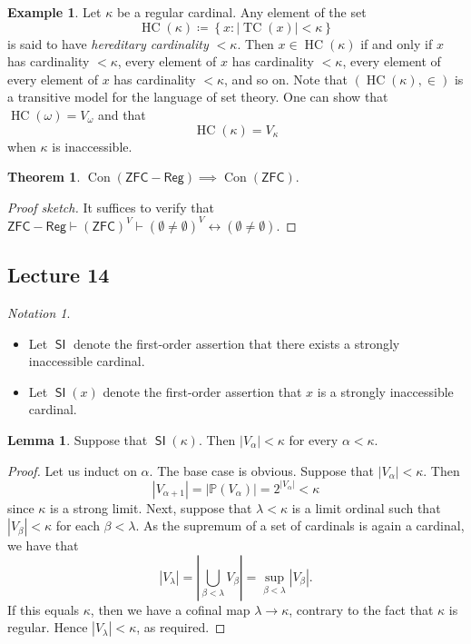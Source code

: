 \documentclass[10pt,letterpaper,cm]{nupset}
\theoremstyle{definition}
\newtheorem{exmp}[definition]{Example}
\theoremstyle{theorem}
\newtheorem{theorem}[definition]{Theorem}
\newtheorem{lemma}[definition]{Lemma}
\theoremstyle{remark}
\newtheorem*{notation}{Notation}
\renewcommand{\P}{\mathbb P}
\newcommand{\1}{\mathbf{1}}
\newcommand{\0}{\vec 0}
\newcommand{\zfc}{\mathsf{ZFC}}
\DeclareMathOperator{\si}{\mathsf{SI}}
\DeclareMathOperator{\con}{Con}
\DeclareMathOperator{\hc}{HC}
\DeclareMathOperator{\tc}{TC}
\newcommand{\bi}{\begin{itemize}}
\newcommand{\ei}{\end{itemize}}
\begin{document}
\begin{exmp}
Let $\kappa$ be a regular cardinal. Any element of the set $$\hc(\kappa) \coloneqq \left\{x : \left\lvert{\tc(x)}\right\rvert < \kappa\right\} $$ is said to have \textit{hereditary cardinality $<\kappa$}. Then $x \in \hc(\kappa)$ if and only if $x$ has cardinality $< \kappa$, every element of $x$ has cardinality $< \kappa$, every element of every element of $x$ has cardinality $< \kappa$, and so on. Note that $\left(\hc(\kappa), \in\right) $ is a transitive model for the language of set theory.  One can show that $\hc(\omega) = V_{\omega}$ and that 
\[ \label{eqn:si}
\hc(\kappa) =V_{\kappa} \tag{$\star$}
\]
when $\kappa$ is inaccessible. 
\end{exmp}

\begin{theorem}
$\con(\zfc - \mathsf{Reg}) \implies \con(\zfc)$.
\end{theorem}
\begin{proof}[Proof sketch]
It suffices to verify that $\zfc - \mathsf{Reg} \vdash \left(\zfc\right)^V \vdash \left(\emptyset \ne \emptyset \right)^V \leftrightarrow  \left(\emptyset \ne \emptyset\right)$.
\end{proof}

\subsection{Lecture 14}

\begin{notation}$ $
\bi
\item Let $\si$ denote the first-order assertion that there exists a strongly inaccessible cardinal.
\item Let $\si(x)$ denote the first-order assertion that $x$ is a strongly inaccessible cardinal.
\ei
\end{notation}

\begin{lemma}\label{Vcard}
Suppose that $\si(\kappa)$. Then $\left\lvert{V_{\alpha}}\right\rvert < \kappa$ for every $\alpha <\kappa$.
\end{lemma}
\begin{proof}
Let us induct on $\alpha$. The base case is obvious. Suppose that $\left\lvert{V_{\alpha}}\right\rvert <\kappa$. Then 
\[
\left\lvert{V_{\alpha +1}}\right\rvert = \left\lvert{\P(V_{\alpha})}\right\rvert = 2^{\left\lvert{V_{\alpha}}\right\rvert} <\kappa
\] since $\kappa$ is a strong limit. Next, suppose that $\lambda <\kappa$ is a limit ordinal such that $\left\lvert{V_{\beta}}\right\rvert <\kappa$ for each $\beta < \lambda$. As the supremum of a set of cardinals is again a cardinal, we have that
\[
\left\lvert{V_{\lambda}}\right\rvert = \left\lvert{\bigcup_{\beta < \lambda}V_{\beta}}\right\rvert = \sup_{\beta < \lambda}\left\lvert{V_{\beta}}\right\rvert.
\] If this equals $\kappa$, then we have a cofinal map $\lambda \to \kappa$, contrary to the fact that $\kappa$ is regular. Hence $\left\lvert{V_{\lambda}}\right\rvert < \kappa$, as required.
\end{proof}
\end{document}
